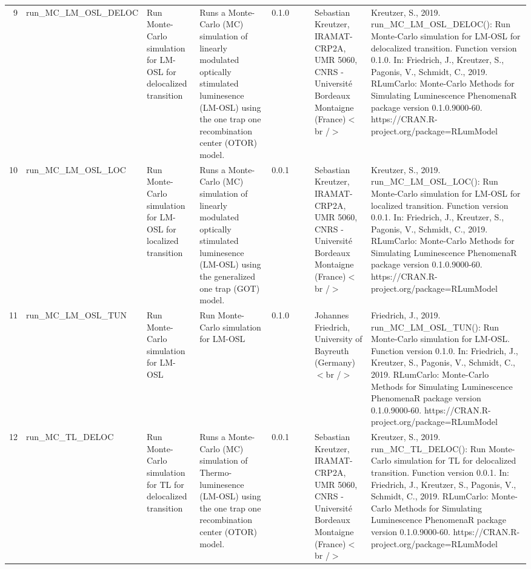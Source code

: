 \begin{table}[ht]
\begin{tabular}{rllllllll}
 \\ 
  9 & run\_MC\_LM\_OSL\_DELOC & Run Monte-Carlo simulation for LM-OSL for delocalized transition & Runs a Monte-Carlo (MC) simulation of linearly modulated optically stimulated luminesence (LM-OSL) using the one trap one recombination center (OTOR) model. & 0.1.0
 &  &  & Sebastian Kreutzer, IRAMAT-CRP2A, UMR 5060, CNRS - Université Bordeaux Montaigne (France)$<$br /$>$ & Kreutzer, S., 2019. run\_MC\_LM\_OSL\_DELOC(): Run Monte-Carlo simulation for LM-OSL for delocalized transition. Function version 0.1.0. In: Friedrich, J., Kreutzer, S., Pagonis, V., Schmidt, C., 2019. RLumCarlo: Monte-Carlo Methods for Simulating Luminescence PhenomenaR package version 0.1.0.9000-60. https://CRAN.R-project.org/package=RLumModel
 \\ 
  10 & run\_MC\_LM\_OSL\_LOC & Run Monte-Carlo simulation for LM-OSL for localized transition & Runs a Monte-Carlo (MC) simulation of linearly modulated optically stimulated luminesence (LM-OSL) using the generalized one trap (GOT) model. & 0.0.1
 &  &  & Sebastian Kreutzer, IRAMAT-CRP2A, UMR 5060, CNRS - Université Bordeaux Montaigne (France)$<$br /$>$ & Kreutzer, S., 2019. run\_MC\_LM\_OSL\_LOC(): Run Monte-Carlo simulation for LM-OSL for localized transition. Function version 0.0.1. In: Friedrich, J., Kreutzer, S., Pagonis, V., Schmidt, C., 2019. RLumCarlo: Monte-Carlo Methods for Simulating Luminescence PhenomenaR package version 0.1.0.9000-60. https://CRAN.R-project.org/package=RLumModel
 \\ 
  11 & run\_MC\_LM\_OSL\_TUN & Run Monte-Carlo simulation for LM-OSL & Run Monte-Carlo simulation for LM-OSL & 0.1.0
 &  &  & Johannes Friedrich, University of Bayreuth (Germany)$<$br /$>$ & Friedrich, J., 2019. run\_MC\_LM\_OSL\_TUN(): Run Monte-Carlo simulation for LM-OSL. Function version 0.1.0. In: Friedrich, J., Kreutzer, S., Pagonis, V., Schmidt, C., 2019. RLumCarlo: Monte-Carlo Methods for Simulating Luminescence PhenomenaR package version 0.1.0.9000-60. https://CRAN.R-project.org/package=RLumModel
 \\ 
  12 & run\_MC\_TL\_DELOC & Run Monte-Carlo simulation for TL for delocalized transition & Runs a Monte-Carlo (MC) simulation of Thermo-luminesence (LM-OSL) using the one trap one recombination center (OTOR) model. & 0.0.1
 &  &  & Sebastian Kreutzer, IRAMAT-CRP2A, UMR 5060, CNRS - Université Bordeaux Montaigne (France)$<$br /$>$ & Kreutzer, S., 2019. run\_MC\_TL\_DELOC(): Run Monte-Carlo simulation for TL for delocalized transition. Function version 0.0.1. In: Friedrich, J., Kreutzer, S., Pagonis, V., Schmidt, C., 2019. RLumCarlo: Monte-Carlo Methods for Simulating Luminescence PhenomenaR package version 0.1.0.9000-60. https://CRAN.R-project.org/package=RLumModel

\end{tabular}
\end{table}
